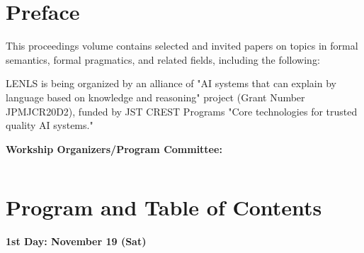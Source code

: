 \documentclass[12pt]{jarticle}
\begin{document}
\newpage

\vspace*{20cm}
\vfill
\begin{large}

\end{large}

\newpage
\pagestyle{plain}

\newpage
\section*{Preface}


This proceedings volume contains selected and invited papers on topics in formal semantics, formal pragmatics, and related fields, including the following:
\begin{itemize}
\end{itemize}


LENLS is being organized by an alliance of "AI systems that can explain by language based on knowledge and reasoning" project (Grant Number JPMJCR20D2), funded by JST CREST Programs "Core technologies for trusted quality AI systems."


\vspace*{2.5cm}

\begin{center}
{\large \textbf{Workship Organizers/Program Committee:}} \\
\vspace*{1cm}
\begin{tabular}{l}

\end{tabular}
\end{center}
\newpage
  
\section*{Program and Table of Contents}

\newcommand{\slot}[2]{\noindent \underline{#1 \  #2} \\}
\newcommand{\talk}[3]{
  \noindent #2 \\ 
  \indent\indent \textit{#1} \dotfill #3 
  \smallskip \\
  }
\newcommand{\talkk}[3]{
  \noindent #2 \\ 
  \indent\indent \textit{#1}
  \smallskip \\
  }


\noindent\textbf{\large 
1st Day: November 19 (Sat)
}\\
\end{document}
